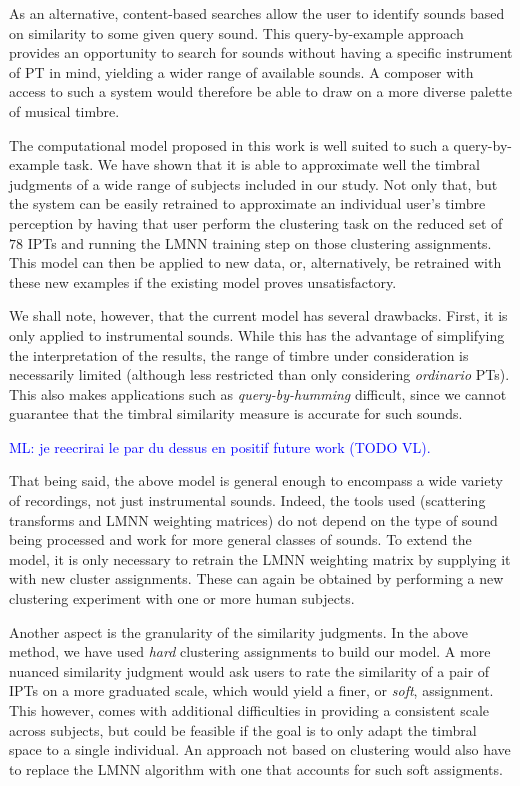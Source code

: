 \documentclass{bmcart}
\newcommand{\ml}[1]{\textcolor{blue}{ML: #1}\xspace}
\begin{document}
As an alternative, content-based searches allow the user to identify sounds based on similarity to some given query sound.
This query-by-example approach provides an opportunity to search for sounds without having a specific instrument of PT in mind, yielding a wider range of available sounds.
A composer with access to such a system would therefore be able to draw on a more diverse palette of musical timbre.

The computational model proposed in this work is well suited to such a query-by-example task.
We have shown that it is able to approximate well the timbral judgments of a wide range of subjects included in our study.
Not only that, but the system can be easily retrained to approximate an individual user's timbre perception by having that user perform the clustering task on the reduced set of $78$ IPTs and running the LMNN training step on those clustering assignments.
This model can then be applied to new data, or, alternatively, be retrained with these new examples if the existing model proves unsatisfactory.

We shall note, however, that the current model has several drawbacks.
First, it is only applied to instrumental sounds.
While this has the advantage of simplifying the interpretation of the results, the range of timbre under consideration is necessarily limited (although less restricted than only considering \emph{ordinario} PTs).
This also makes applications such as \emph{query-by-humming} difficult, since we cannot guarantee that the timbral similarity measure is accurate for such sounds.

\ml{je reecrirai le par du dessus en positif future work (TODO VL).}

That being said, the above model is general enough to encompass a wide variety of recordings, not just instrumental sounds.
Indeed, the tools used (scattering transforms and LMNN weighting matrices) do not depend on the type of sound being processed and work for more general classes of sounds.
To extend the model, it is only necessary to retrain the LMNN weighting matrix by supplying it with new cluster assignments.
These can again be obtained by performing a new clustering experiment with one or more human subjects.

Another aspect is the granularity of the similarity judgments.
In the above method, we have used \emph{hard} clustering assignments to build our model.
A more nuanced similarity judgment would ask users to rate the similarity of a pair of IPTs on a more graduated scale, which would yield a finer, or \emph{soft}, assignment.
This however, comes with additional difficulties in providing a consistent scale across subjects, but could be feasible if the goal is to only adapt the timbral space to a single individual.
An approach not based on clustering would also have to replace the LMNN algorithm with one that accounts for such soft assigments.
\end{document}
